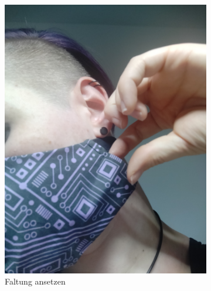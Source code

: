 \documentclass[12pt,parskip=full]{scrartcl}
\begin{document}
\begin{figure}[ht]
    \vspace{0.5cm}
    \centering
    \begin{subfigure}{0.48\textwidth}
        \centering
        \includegraphics[width = \linewidth]{Pictures/11_Folding/Folding1.jpg}
        \caption{Faltung ansetzen}
        \label{Folding1}
    \end{subfigure}
    \begin{subfigure}{0.48\textwidth}
        \centering

\end{subfigure}
\end{figure}
\end{document}
